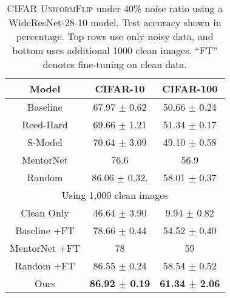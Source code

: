 
\begin{table}[t]
\begin{center}
\caption{CIFAR \textsc{UniformFlip} under 40\% noise ratio using a WideResNet-28-10 model. Test
accuracy shown in percentage. Top rows use only noisy data, and bottom uses additional 1000 clean
images. ``FT'' denotes fine-tuning on clean data.}
\label{tab:uniformflip}
\vskip 0.1in
\begin{small}
\begin{sc}
\begin{tabular}{ccc}
\toprule
Model              &  CIFAR-10                    & CIFAR-100                     \\
\midrule
Baseline           & 67.97 $\pm$ 0.62             & 50.66 $\pm$ 0.24              \\
Reed-Hard          & 69.66 $\pm$ 1.21             & 51.34 $\pm$  0.17             \\
S-Model            & 70.64 $\pm$ 3.09             & 49.10 $\pm$ 0.58              \\
MentorNet          & 76.6                         & 56.9                          \\
Random             & 86.06 $\pm$ 0.32.            & 58.01 $\pm$ 0.37              \\
\midrule
\multicolumn{3}{c}{Using 1,000 clean images} \\
\midrule
Clean Only         & 46.64 $\pm$ 3.90             & 9.94 $\pm$ 0.82               \\
Baseline +FT       & 78.66 $\pm$ 0.44             & 54.52 $\pm$ 0.40              \\
MentorNet +FT      & 78                           & 59                            \\
Random +FT         & 86.55 $\pm$ 0.24             & 58.54 $\pm$ 0.52              \\
Ours               & \textbf{86.92 $\pm$ 0.19}    & \textbf{61.34 $\pm$ 2.06}     \\
\bottomrule
\end{tabular}
\end{sc}
\end{small}
\end{center}
\vskip -0.1in
\end{table}